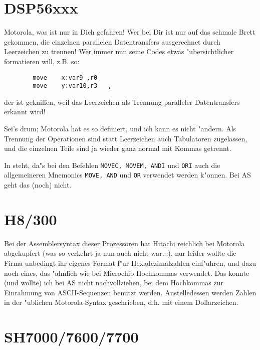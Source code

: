 \documentclass[12pt,a4paper,twoside]{report}
\newcommand{\tty}[1]{{\tt #1}}
\begin{document}

\section{DSP56xxx}

Motorola, was ist nur in Dich gefahren!  Wer bei Dir ist nur auf das
schmale Brett gekommen, die einzelnen parallelen Datentransfers
ausgerechnet durch Leerzeichen zu trennen!  Wer immer nun seine Codes
etwas "ubersichtlicher formatieren will, z.B. so:
\begin{verbatim}
        move    x:var9 ,r0
        move    y:var10,r3   ,
\end{verbatim}
der ist gekniffen, weil das Leerzeichen als Trennung paralleler
Datentransfers erkannt wird!
\par
Sei's drum; Motorola hat es so definiert, und ich kann es nicht
"andern.  Als Trennung der Operationen sind statt Leerzeichen auch
Tabulatoren zugelassen, und die einzelnen Teile sind ja wieder ganz
normal mit Kommas getrennt.
\par
In \cite{Mot56} steht, da"s bei den Befehlen \tty{MOVEC, MOVEM, ANDI} und
\tty{ORI} auch die allgemeineren Mnemonics \tty{MOVE, AND} und \tty{OR}
verwendet werden k"onnen.  Bei AS geht das (noch) nicht.


\section{H8/300}

Bei der Assemblersyntax dieser Prozessoren hat Hitachi reichlich
bei Motorola abgekupfert (was so verkehrt ja nun auch nicht war...),
nur leider wollte die Firma unbedingt ihr eigenes Format f"ur
Hexadezimalzahlen einf"uhren, und dazu noch eines, das "ahnlich wie
bei Microchip Hochkommas verwendet.  Das konnte (und wollte) ich bei
AS nicht nachvollziehen, bei dem Hochkommas zur Einrahmung von
ASCII-Sequenzen benutzt werden.  Anstelledessen werden Zahlen in der
"ublichen Motorola-Syntax geschrieben, d.h. mit einem Dollarzeichen.


\section{SH7000/7600/7700}
\end{document}
